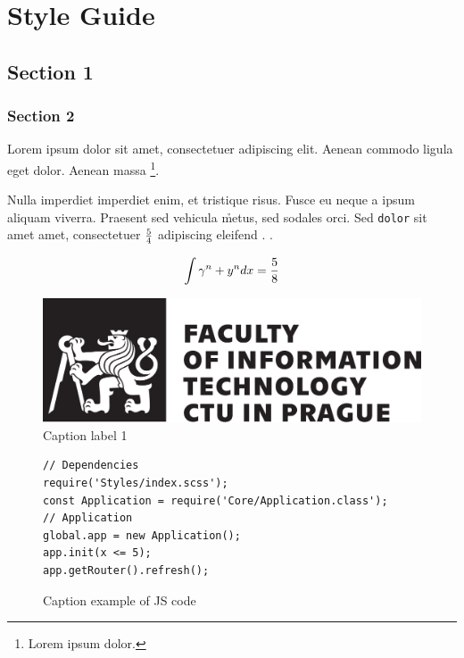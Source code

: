 \chapter{Style Guide}\label{styleguide}



\section{Section 1}



\subsection{Section 2}

\begin{REFACTOR}
   Lorem ipsum dolor sit amet, consectetuer adipiscing elit. Aenean commodo ligula eget dolor. Aenean massa \footnote{Lorem ipsum dolor.}.
\end{REFACTOR}


Nulla imperdiet imperdiet enim, et tristique risus. Fusce eu neque a ipsum aliquam viverra. Praesent sed vehicula \h{metus}, sed sodales orci. Sed \verb|dolor| sit amet amet, consectetuer ${5} \over {4}$ adipiscing eleifend . .

$$\int {\gamma^n + y^n } dx = { 5 \over 8}$$

\begin{figure}[htbp]
   \centering
   \includegraphics[max width=\textwidth]{cvut-logo-bw-en.pdf}
   \caption[List label 1]{Caption label 1}\label{pic:ctulogo}
\end{figure}


\begin{figure}[htbp]
   \centering
   \begin{verbatim}
// Dependencies
require('Styles/index.scss');
const Application = require('Core/Application.class');
// Application
global.app = new Application();
app.init(x <= 5);
app.getRouter().refresh();
   \end{verbatim}
   \caption[List example of JS code]{Caption example of JS code}\label{code:jsexample}
\end{figure}


